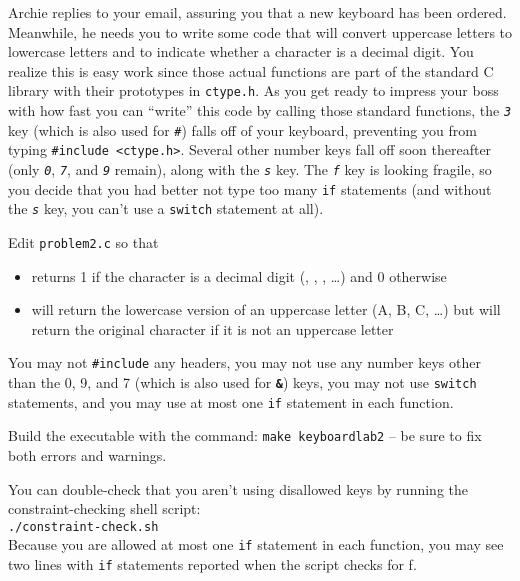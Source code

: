 Archie replies to your email, assuring you that a new keyboard has been ordered.
Meanwhile, he needs you to write some code that will convert uppercase letters to lowercase letters and to indicate whether a character is a decimal digit.
You realize this is easy work since those actual functions are part of the standard C library with their prototypes in \texttt{ctype.h}.
As you get ready to impress your boss with how fast you can ``write'' this code by calling those standard functions, the \textit{\texttt{3}} key (which is also used for \textit{\texttt{\#}}) falls off of your keyboard, preventing you from typing \lstinline{#include <ctype.h>}.
Several other number keys fall off soon thereafter (only \textit{\texttt{0}}, \textit{\texttt{7}}, and \textit{\texttt{9}} remain), along with the \textit{\texttt{s}} key.
The \textit{\texttt{f}} key is looking fragile, so you decide that you had better not type too many \lstinline{if} statements (and without the \textit{\texttt{s}} key, you can't use a \lstinline{switch} statement at all).

Edit \texttt{problem2.c} so that
\begin{itemize}
    \item {} returns 1 if the character is a decimal digit (\textquotesingle, \textquotesingle, \textquotesingle, \dots) and 0 otherwise
    \item {} will return the lowercase version of an uppercase letter (\textquotesingle A\textquotesingle, \textquotesingle B\textquotesingle, \textquotesingle C\textquotesingle, \dots) but will return the original character if it is not an uppercase letter
\end{itemize}
You may not \lstinline{#include} any headers, you may not use any number keys other than the 0, 9, and 7 (which is also used for \textbf{\texttt{\&}}) keys, you may not use \lstinline{switch} statements, and you may use at most one \lstinline{if} statement in each function.

Build the executable with the command: \texttt{make keyboardlab2} -- be sure to fix both errors and warnings.

You can double-check that you aren't using disallowed keys by running the constraint-checking shell script: \\
\texttt{./constraint-check.sh} \\
Because you are allowed at most one \lstinline{if} statement in each function, you may see two lines with \lstinline{if} statements reported when the script checks for \textquotesingle f\textquotesingle.
